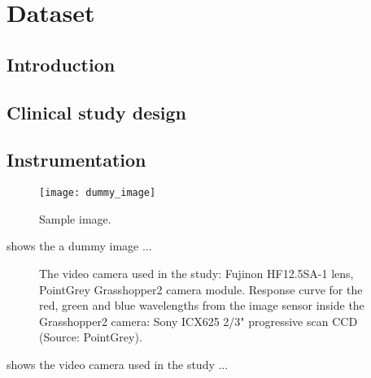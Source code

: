 \chapter{Dataset}
\label{chapter:dataset} 


\section{Introduction}

\lipsum[2-4]

\section{Clinical study design}

\lipsum[2-4]

\section{Instrumentation}


\begin{figure}[tbh]
  \centering
  \texttt{[image: dummy\_image]}
  \caption[Sample image]
  {
  Sample image.
  }
  \label{fig:sample_image}
\end{figure}

 shows the a dummy image ...


\lipsum[2-4]

\begin{figure}[tbh]
  \centering
  \caption[The PointGrey Grasshopper2 video camera]
  {
  The video camera used in the study:
     Fujinon HF12.5SA-1 lens,
   PointGrey Grasshopper2 camera module.
   Response curve for the red, green and blue wavelengths from the image sensor inside the Grasshopper2 camera: Sony ICX625 2/3" progressive scan CCD (Source: PointGrey).
  }
  \label{fig:grasshopper}
\end{figure}

 shows the video camera used in the study ...

